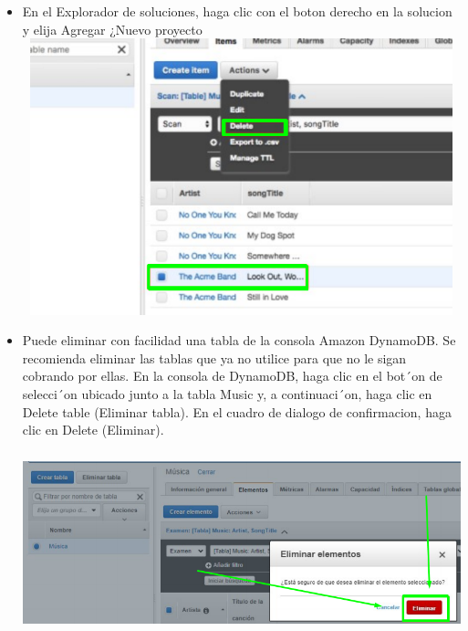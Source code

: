 \documentclass[12pt,a4paper,oneside]{book}
\begin{document}
\newpage

\begin{itemize}
	\item {En el Explorador de soluciones, haga clic con el boton derecho en la solucion y elija Agregar ¿Nuevo proyecto
}\\
	
	\includegraphics[width=16cm, height=8cm]{img/15.png}\\
	
	\item {Puede eliminar con facilidad una tabla de la consola Amazon DynamoDB. Se recomienda eliminar las tablas que ya no utilice para que no le sigan cobrando por ellas. En la consola de DynamoDB, haga clic en el bot´on de selecci´on ubicado junto a la tabla Music y, a continuaci´on, haga clic en Delete table (Eliminar tabla). En el cuadro de dialogo de confirmacion, haga clic en Delete (Eliminar).}\\
	
	\includegraphics[width=16cm, height=6cm]{img/16.png}\\
	
\end{itemize}
\end{document}
